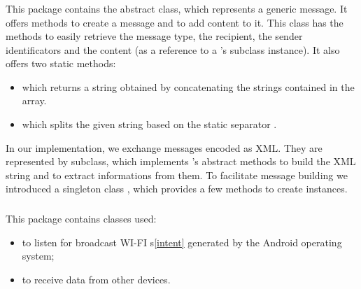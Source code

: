 	\subsubsection{}
	This package contains the  abstract class, which represents a generic message. It offers methods to create a message and to add content to it. This class has the methods to easily retrieve the message type, the recipient, the sender identificators and the content (as a reference to a 's subclass instance). It also offers two static methods:
	\begin{itemize}
		\item {} which returns a string obtained by concatenating the strings contained in the  array.
		\item {} which splits the given string based on the static separator . 
	\end{itemize}
	In our implementation, we exchange messages encoded as XML. They are represented by  subclass, which implements 's abstract methods to build the XML string and to extract informations from them. To facilitate message building we introduced a singleton class , which provides a few methods to create  instances.
	\hfill\\
	\subsubsection{}
	This package contains classes used:
	\begin{itemize}
		\item to listen for broadcast WI-FI s\ref{intent} generated by the Android operating system;
		\item to receive data from other devices.
	\end{itemize}
	
